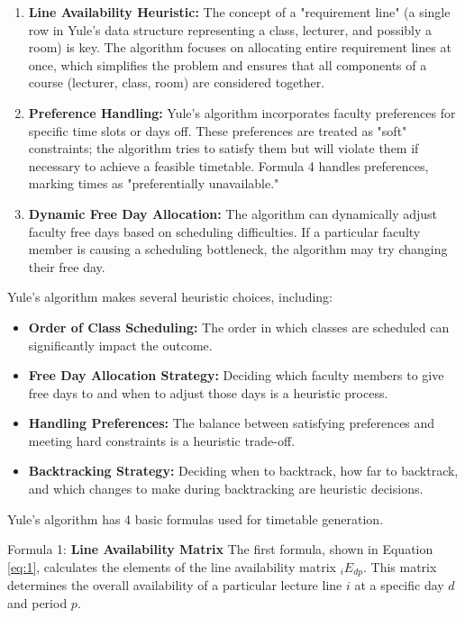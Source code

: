 \begin{enumerate}
    \item \textbf{Line Availability Heuristic:} The concept of a "requirement line" (a single row in Yule's data structure representing a class, lecturer, and possibly a room) is key.
	The algorithm focuses on allocating entire requirement lines at once, which simplifies the problem and ensures that all components of a course (lecturer, class, room) are considered together.

    \item \textbf{Preference Handling:} Yule's algorithm incorporates faculty preferences for specific time slots or days off.
	These preferences are treated as "soft" constraints; the algorithm tries to satisfy them but will violate them if necessary to achieve a feasible timetable.
	Formula 4 handles preferences, marking times as "preferentially unavailable."

    \item \textbf{Dynamic Free Day Allocation:} The algorithm can dynamically adjust faculty free days based on scheduling difficulties.
	If a particular faculty member is causing a scheduling bottleneck, the algorithm may try changing their free day.
\end{enumerate}

Yule's algorithm makes several heuristic choices, including:

\begin{itemize}
    \item \textbf{Order of Class Scheduling:} The order in which classes are scheduled can significantly impact the outcome.
    \item \textbf{Free Day Allocation Strategy:} Deciding which faculty members to give free days to and when to adjust those days is a heuristic process.
    \item \textbf{Handling Preferences:} The balance between satisfying preferences and meeting hard constraints is a heuristic trade-off.
    \item \textbf{Backtracking Strategy:} Deciding when to backtrack, how far to backtrack, and which changes to make during backtracking are heuristic decisions.
\end{itemize}

Yule's algorithm has 4 basic formulas used for timetable generation.

Formula 1: \textbf{Line Availability Matrix} The first formula, shown in Equation \ref{eq:1}, calculates the elements of the line availability matrix \( _iE_{dp} \).
This matrix determines the overall availability of a particular lecture line \( i \) at a specific day \( d \) and period \( p \).

